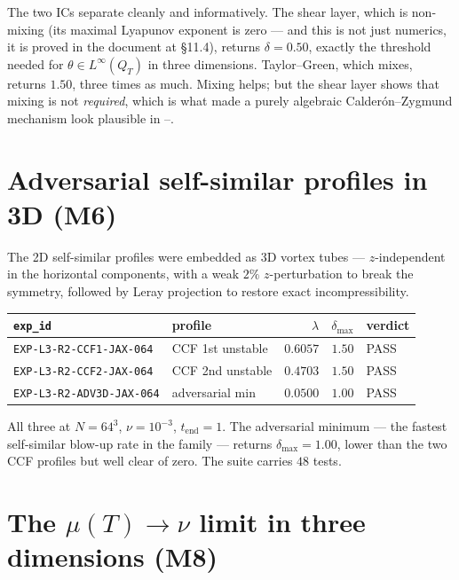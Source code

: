 The two ICs separate cleanly and informatively. The shear layer, which is
non-mixing (its maximal Lyapunov exponent is zero --- and this is not just
numerics, it is proved in the document at \S11.4), returns \(\delta=0.50\),
exactly the threshold needed for \(\theta\in L^\infty(Q_T)\) in three
dimensions. Taylor--Green, which mixes, returns \(1.50\), three times as much.
Mixing helps; but the shear layer shows that mixing is not \emph{required},
which is what made a purely algebraic Calder\'on--Zygmund mechanism look
plausible in --.

\section{Adversarial self-similar profiles in 3D (M6)}
\label{sec:wang-3d}

The 2D self-similar profiles were embedded as 3D vortex tubes ---
\(z\)-independent in the horizontal components, with a weak \(2\%\)
\(z\)-perturbation to break the symmetry, followed by Leray projection to
restore exact incompressibility.

\begin{center}
\small
\begin{tabular}{@{}l l r r l@{}}
\toprule
\texttt{exp\_id} & profile & \(\lambda\) & \(\delta_{\max}\) & verdict \\
\midrule
\texttt{EXP-L3-R2-CCF1-JAX-064} & CCF 1st unstable & \(0.6057\) & \(1.50\) & \textsf{PASS} \\
\texttt{EXP-L3-R2-CCF2-JAX-064} & CCF 2nd unstable & \(0.4703\) & \(1.50\) & \textsf{PASS} \\
\texttt{EXP-L3-R2-ADV3D-JAX-064} & adversarial min & \(0.0500\) & \(1.00\) & \textsf{PASS} \\
\bottomrule
\end{tabular}
\end{center}

\medskip
All three at \(N=64^3\), \(\nu=10^{-3}\), \(t_{\mathrm{end}}=1\). The
adversarial minimum --- the fastest self-similar blow-up rate in the family
--- returns \(\delta_{\max}=1.00\), lower than the two CCF profiles but well
clear of zero. The suite carries \(48\) tests.

\section{The \texorpdfstring{\(\mu(T)\to\nu\)}{mu -> nu} limit in three dimensions (M8)}
\label{sec:mu-limit-3d}

